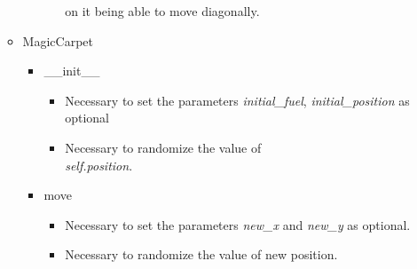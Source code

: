 \documentclass[12pt]{article}
\begin{document}
\begin{enumerate}[a.]
\begin{mdframed}
\begin{itemize}
\begin{itemize}
\begin{itemize}
                    on it being able to move diagonally.
                \end{itemize}
                \color{black}
            \end{itemize}
            \item MagicCarpet
            \begin{itemize}
                \item \_\_init\_\_
                \color{red}
                \begin{itemize}
                    \item Necessary to set the parameters \textit{initial\_fuel},
                    \textit{initial\_position} as optional
                    \item Necessary to randomize the value of \\\textit{self.position}.
                \end{itemize}
                \color{black}
                \item move
                \color{red}
                \begin{itemize}
                    \item Necessary to set the parameters \textit{new\_x} and \textit{new\_y}
                    as optional.
                    \item Necessary to randomize the value of new position.
                \end{itemize}
                \color{black}

            \end{itemize}
        \end{itemize}

    \end{mdframed}

\end{enumerate}
\end{document}
